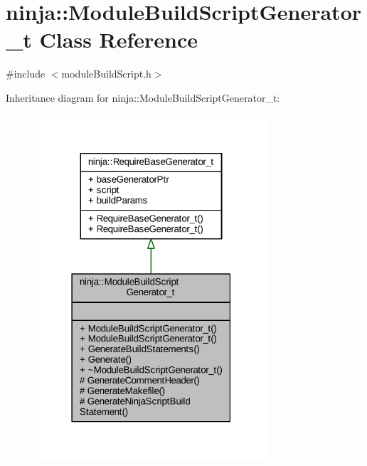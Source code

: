 \hypertarget{classninja_1_1_module_build_script_generator__t}{}\section{ninja\+:\+:Module\+Build\+Script\+Generator\+\_\+t Class Reference}
\label{classninja_1_1_module_build_script_generator__t}


{\ttfamily \#include $<$module\+Build\+Script.\+h$>$}



Inheritance diagram for ninja\+:\+:Module\+Build\+Script\+Generator\+\_\+t\+:
\nopagebreak
\begin{figure}[H]
\begin{center}
\leavevmode
\includegraphics[width=247pt]{classninja_1_1_module_build_script_generator__t__inherit__graph}
\end{center}
\end{figure}


